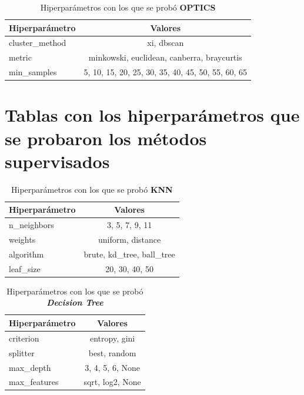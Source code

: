 \begin{appendices}
		\begin{table}[htb]
			\centering
			\caption{Hiperparámetros con los que se probó \textbf{OPTICS}}
			\label{table:6}
			\begin{tabular}{lc}
			\toprule
			Hiperparámetro &                                           Valores \\
			\midrule
			cluster\_method &                                        xi, dbscan \\
					metric &        minkowski, euclidean, canberra, braycurtis \\
			   min\_samples & 5, 10, 15, 20, 25, 30, 35, 40, 45, 50, 55, 60, 65 \\
			\bottomrule
			\end{tabular}
		\end{table}
		
	\newpage
	\section*{Tablas con los hiperparámetros que se probaron los métodos supervisados}

		\begin{table}[ht!]
			\centering
			\caption{Hiperparámetros con los que se probó  \textbf{KNN}}
			\label{table:7}
			\begin{tabular}{lc}
				\toprule
				Hiperparámetro &                   Valores \\
				\midrule
				   n\_neighbors &            3, 5, 7, 9, 11 \\
					   weights &         uniform, distance \\
					 algorithm & brute, kd\_tree, ball\_tree \\
					 leaf\_size &            20, 30, 40, 50 \\
				\bottomrule
			\end{tabular}
		\end{table}

		\begin{table}[ht!]
			\centering
			\caption{Hiperparámetros con los que se probó \textbf{\emph{Decision Tree}}}
			\label{table:8}
			\begin{tabular}{lc}
				\toprule
				Hiperparámetro &          Valores \\
				\midrule
				     criterion &    entropy, gini \\
				      splitter &     best, random \\
				     max\_depth & 3, 4, 5, 6, None \\
				  max\_features & sqrt, log2, None \\
				\bottomrule
			\end{tabular}
		\end{table}


\end{appendices}
